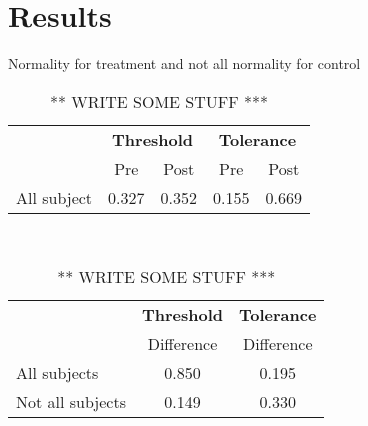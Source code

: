\section{Results}

Normality for treatment and not all normality for control


\begin{table} [H]
	\centering
	\caption{} \vspace{-.25cm}
	\begin{tabular}{l|c c | c c}
		\toprule
	 & \multicolumn{2}{c}{{\footnotesize \textbf{Threshold}}} & 	\multicolumn{2}{c}{{\footnotesize \textbf{Tolerance}}} \\
	 & {\footnotesize Pre} & {\footnotesize Post} & {\footnotesize Pre} & {\footnotesize Post} \\
		\midrule
		{\footnotesize All subject }  & {\footnotesize 0.327} & {\footnotesize 0.352} & {\footnotesize 0.155}  & {\footnotesize 0.669}\\
		\bottomrule
	\end{tabular}
	\smallskip \\
	\caption*{{\footnotesize *** WRITE SOME STUFF ***}}
	\label{tab:Kruskall Wallis}
\end{table} \vspace{-.5cm}


\begin{table} [H]
	\centering
	\caption{} \vspace{-.25cm}
	\begin{tabular}{l|c| c}
		\toprule
	 & \multicolumn{1}{c}{{\footnotesize \textbf{Threshold}}} & 	\multicolumn{1}{c}{{\footnotesize \textbf{Tolerance}}} \\
	 & {\footnotesize Difference} &  {\footnotesize Difference} \\
		\midrule
		{\footnotesize All subjects}  & {\footnotesize 0.850} & {\footnotesize 0.195} \\
			{\footnotesize Not all subjects}  & {\footnotesize 0.149} & {\footnotesize 0.330} \\
		\bottomrule
	\end{tabular}
	\smallskip \\
	\caption*{{\footnotesize *** WRITE SOME STUFF ***}}
	\label{tab:Difference}
\end{table} \vspace{-.5cm}